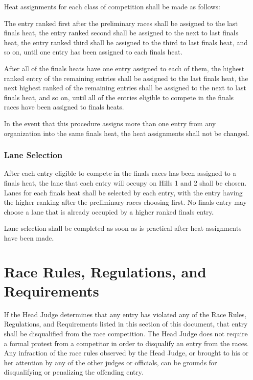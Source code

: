 Heat assignments for each class of competition shall be made as follows:

The entry ranked first after the preliminary races shall be assigned to the last finals heat, the entry ranked second shall be assigned to the next to last finals heat, the entry ranked third shall be assigned to the third to last finals heat, and so on, until one entry has been assigned to each finals heat.

After all of the finals heats have one entry assigned to each of them, the highest ranked entry of the remaining entries shall be assigned to the last finals heat, the next highest ranked of the remaining entries shall be assigned to the next to last finals heat, and so on, until all of the entries eligible to compete in the finals races have been assigned to finals heats.

In the event that this procedure assigns more than one entry from any organization into the same finals heat, the heat assignments shall not be changed.

\subsubsection{Lane Selection}

After each entry eligible to compete in the finals races has been assigned to a finals heat, the lane that each entry will occupy on Hills 1 and 2 shall be chosen. Lanes for each finals heat shall be selected by each entry, with the entry having the higher ranking after the preliminary races choosing first. No finals entry may choose a lane that is already occupied by a higher ranked finals entry.

Lane selection shall be completed as soon as is practical after heat assignments have been made.

\section{Race Rules, Regulations, and Requirements}

If the Head Judge determines that any entry has violated any of the Race Rules, Regulations, and Requirements listed in this section of this document, that entry shall be disqualified from the race competition. The Head Judge does not require a formal protest from a competitor in order to disqualify an entry from the races. Any infraction of the race rules observed by the Head Judge, or brought to his or her attention by any of the other judges or officials, can be grounds for disqualifying or penalizing the offending entry.

